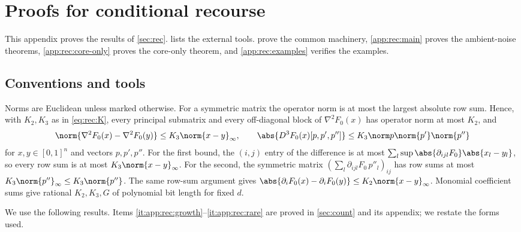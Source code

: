 \section{Proofs for conditional recourse}\label{app:rec}

This appendix proves the results of \cref{sec:rec}. 
lists the external tools. 
prove the common machinery, \cref{app:rec:main} proves the ambient-noise
theorems, \cref{app:rec:core-only} proves the core-only theorem, and
\cref{app:rec:examples} verifies the examples.

\subsection{Conventions and tools}\label{app:rec:tools}

Norms are Euclidean unless marked otherwise. For a symmetric matrix the
operator norm is at most the largest absolute row sum. Hence, with $K_2,K_3$
as in \eqref{eq:rec:K}, every principal submatrix and every off-diagonal
block of $\nabla^2F_0(x)$ has operator norm at most $K_2$, and
\begin{equation}\label{eq:app:rec:hessvar}
 \norm{\nabla^2F_0(x)-\nabla^2F_0(y)}\le K_3\norm{x-y}_\infty,\qquad
 \abs{D^3F_0(x)[p,p',p'']}\le K_3\norm p\norm{p'}\norm{p''}
\end{equation}
for $x,y\in[0,1]^n$ and vectors $p,p',p''$. For the first bound, the
$(i,j)$ entry of the difference is at most
$\sum_l\sup\abs{\partial_{ijl}F_0}\abs{x_l-y_l}$, so every row sum is at
most $K_3\norm{x-y}_\infty$. For the second, the symmetric matrix
$(\sum_l\partial_{ijl}F_0\,p''_l)_{ij}$ has row sums at most
$K_3\norm{p''}_\infty\le K_3\norm{p''}$. The same row-sum argument gives
$\abs{\partial_iF_0(x)-\partial_iF_0(y)}\le K_2\norm{x-y}_\infty$. Monomial
coefficient sums give rational $K_2,K_3,G$ of polynomial bit length for
fixed $d$.

We use the following results. Items \ref{it:app:rec:growth}--\ref{it:app:rec:rare}
are proved in \cref{sec:count} and its appendix; we restate the forms used.

